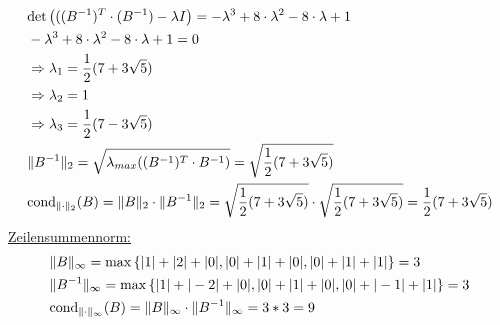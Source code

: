 \begin{align*}
\begin{split}
&\mathrm{det}\left(((B^{-1})^T\cdot(B^{-1})-\lambda I \right)=-\lambda^3+8\cdot\lambda^2-8\cdot\lambda+1\\
&-\lambda^3+8\cdot\lambda^2-8\cdot\lambda+1=0\\
&\Rightarrow \lambda_{1}=\frac{1}{2}(7+3\sqrt{5})\\
&\Rightarrow\lambda_{2}=1\\
&\Rightarrow\lambda_{3}=\frac{1}{2}(7-3\sqrt{5})\\
&\|B^{-1}\|_2=\sqrt{\lambda_{max}((B^{-1})^T\cdot B^{-1})}=\sqrt{\frac{1}{2}(7+3\sqrt{5})}\\
&\mathrm{cond}_{\| \cdot \|_2}(B)=\|B\|_2\cdot\|B^{-1}\|_2=\sqrt{\frac{1}{2}(7+3\sqrt{5})}\cdot\sqrt{\frac{1}{2}(7+3\sqrt{5})}=\frac{1}{2}(7+3\sqrt{5})
\end{split}
\end{align*}
\underline{Zeilensummennorm:}
\begin{align*}
\begin{split}
&\|B\|_\infty = \mathrm{max} \left\lbrace|1|+|2|+|0|, |0|+|1|+|0|,|0|+|1|+|1|\right\rbrace = 3\\
&\|B^{-1}\|_\infty = \mathrm{max} \left\lbrace|1|+|-2|+|0|, |0|+|1|+|0|,|0|+|-1|+|1|\right\rbrace = 3\\
&\mathrm{cond}_{\| \cdot \|_\infty}(B)=\|B\|_\infty\cdot\|B^{-1}\|_\infty = 3 * 3 = 9\\
\end{split}
\end{align*}